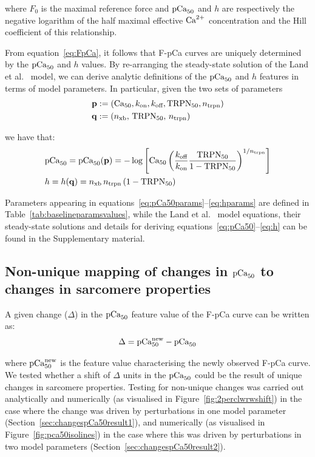 \noindent
where $F_{0}$ is the maximal reference force and $\textrm{pCa}_{50}$ and $h$ are respectively the negative logarithm of the half maximal effective $\textrm{Ca}^{2+}$ concentration and the Hill coefficient of this relationship.

\vspace{0.2cm}
From equation~\eqref{eq:FpCa}, it follows that F-pCa curves are uniquely determined by the $\textrm{pCa}_{50}$ and $h$ values. By re-arranging the steady-state solution of the Land et al.~\cite{Land:2012} model, we can derive analytic definitions of the $\textrm{pCa}_{50}$ and $h$ features in terms of model parameters. In particular, given the two sets of parameters
%
\begin{align}
    & \mathbf{p} := (\textrm{Ca}_{50}, k_{\textrm{on}}, k_{\textrm{off}}, \textrm{TRPN}_{50}, n_{\textrm{trpn}}) \label{eq:pCa50params} \\
    & \mathbf{q} := (n_{\textrm{xb}},\,\textrm{TRPN}_{50},\,n_{\textrm{trpn}}) \label{eq:hparams}
\end{align}

we have that:
%
\begin{align}
    & \textrm{pCa}_{50} = \textrm{pCa}_{50}(\mathbf{p}) =  -\log\left[\textrm{Ca}_{50}\left(\frac{k_{\textrm{off}}}{k_{\textrm{on}}}\frac{\textrm{TRPN}_{50}}{1-\textrm{TRPN}_{50}}\right)^{1/n_{\textrm{trpn}}}\right] \label{eq:pCa50} \\
    & h = h(\mathbf{q}) = n_{\textrm{xb}}\,n_{\textrm{trpn}}\,(1-\textrm{TRPN}_{50}) \label{eq:h}
\end{align}

Parameters appearing in equations~\eqref{eq:pCa50params}--\eqref{eq:hparams} are defined in Table~\ref{tab:baselineparamsvalues}, while the Land et al.~\cite{Land:2012} model equations, their steady-state solutions and details for deriving equations~\eqref{eq:pCa50}--\eqref{eq:h} can be found in the Supplementary material.


%
%
%
\subsection{Non-unique mapping of changes in $\textrm{pCa}_{50}$ to changes in sarcomere properties}\label{sec:changespCa50}
A given change ($\Delta$) in the $\textrm{pCa}_{50}$ feature value of the F-pCa curve can be written as:
%
\begin{equation}\label{eq:delta}
    \Delta = \textrm{pCa}_{50}^{\text{new}} - \textrm{pCa}_{50}
\end{equation}

\vspace{0.2cm}
where $\textrm{pCa}_{50}^{\text{new}}$ is the feature value characterising the newly observed F-pCa curve. We tested whether a shift of $\Delta$ units in the $\textrm{pCa}_{50}$ could be the result of unique changes in sarcomere properties. Testing for non-unique changes was carried out analytically and numerically (as visualised in Figure~\ref{fig:2perclwrwshift}) in the case where the change was driven by perturbations in one model parameter (Section~\ref{sec:changespCa50result1}), and numerically (as visualised in Figure~\ref{fig:pca50isolines}) in the case where this was driven by perturbations in two model parameters (Section~\ref{sec:changespCa50result2}).

